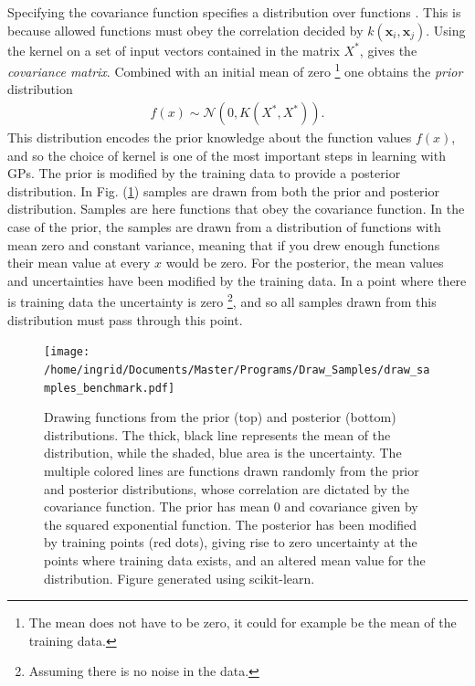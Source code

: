 \documentclass[twoside,english]{uiofysmaster}
\begin{document}
Specifying the covariance function specifies a distribution over functions \cite{rasmussen2006gaussian}. This is because allowed functions must obey the correlation decided by $k(\textbf{x}_i, \textbf{x}_j)$. Using the kernel on a set of input vectors contained in the matrix $X^*$, gives the \textit{covariance matrix}. Combined with an initial mean of zero \footnote{The mean does not have to be zero, it could for example be the mean of the training data.} one obtains the \textit{prior} distribution
\begin{align}
f(x) \sim \mathcal{N} (0, K(X^*, X^*)).
\end{align} 
This distribution encodes the prior knowledge about the function values $f(x)$, and so the choice of kernel is one of the most important steps in learning with GPs. The prior is modified by the training data to provide a posterior distribution. In Fig. (\ref{Fig:: gaussian process : prior posterior drawn samples}) samples are drawn from both the prior and posterior distribution. Samples are here functions that obey the covariance function. In the case of the prior, the samples are drawn from a distribution of functions with mean zero and constant variance, meaning that if you drew enough functions their mean value at every $x$ would be zero. For the posterior, the mean values and uncertainties have been modified by the training data. In a point where there is training data the uncertainty is zero \footnote{Assuming there is no noise in the data.}, and so all samples drawn from this distribution must pass through this point.

\begin{figure}
\centering
\texttt{[image: /home/ingrid/Documents/Master/Programs/Draw\_Samples/draw\_samples\_benchmark.pdf]}
\caption{Drawing functions from the prior (top) and posterior (bottom) distributions. The thick, black line represents the mean of the distribution, while the shaded, blue area is the uncertainty. The multiple colored lines are functions drawn randomly from the prior and posterior distributions, whose correlation are dictated by the covariance function. The prior has mean 0 and covariance given by the squared exponential function. The posterior has been modified by training points (red dots), giving rise to zero uncertainty at the points where training data exists, and an altered mean value for the distribution. Figure generated using scikit-learn.}
\label{Fig:: gaussian process : prior posterior drawn samples}
\end{figure}
\end{document}
